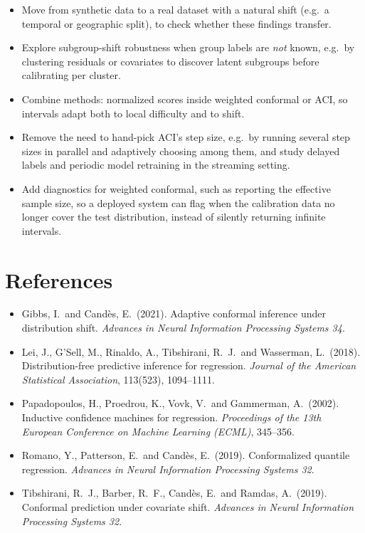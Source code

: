 \documentclass[11pt]{article}
\begin{document}
\begin{itemize}
  \item Move from synthetic data to a real dataset with a natural shift (e.g.\ a
    temporal or geographic split), to check whether these findings transfer.
  \item Explore subgroup-shift robustness when group labels are \emph{not} known,
    e.g.\ by clustering residuals or covariates to discover latent subgroups before
    calibrating per cluster.
  \item Combine methods: normalized scores inside weighted conformal or ACI, so
    intervals adapt both to local difficulty and to shift.
  \item Remove the need to hand-pick ACI's step size, e.g.\ by running several
    step sizes in parallel and adaptively choosing among them, and study delayed
    labels and periodic model retraining in the streaming setting.
  \item Add diagnostics for weighted conformal, such as reporting the effective sample
    size, so a deployed system can flag when the calibration data no longer cover the
    test distribution, instead of silently returning infinite intervals.
\end{itemize}

\section*{References}

\begin{itemize}
  \item Gibbs, I.\ and Cand\`es, E.\ (2021). Adaptive conformal inference under
    distribution shift. \emph{Advances in Neural Information Processing Systems 34}.
  \item Lei, J., G'Sell, M., Rinaldo, A., Tibshirani, R.\ J.\ and Wasserman, L.\
    (2018). Distribution-free predictive inference for regression. \emph{Journal of
    the American Statistical Association}, 113(523), 1094--1111.
  \item Papadopoulos, H., Proedrou, K., Vovk, V.\ and Gammerman, A.\ (2002).
    Inductive confidence machines for regression. \emph{Proceedings of the 13th
    European Conference on Machine Learning (ECML)}, 345--356.
  \item Romano, Y., Patterson, E.\ and Cand\`es, E.\ (2019). Conformalized quantile
    regression. \emph{Advances in Neural Information Processing Systems 32}.
  \item Tibshirani, R.\ J., Barber, R.\ F., Cand\`es, E.\ and Ramdas, A.\ (2019).
    Conformal prediction under covariate shift. \emph{Advances in Neural Information
    Processing Systems 32}.
\end{itemize}
\end{document}
